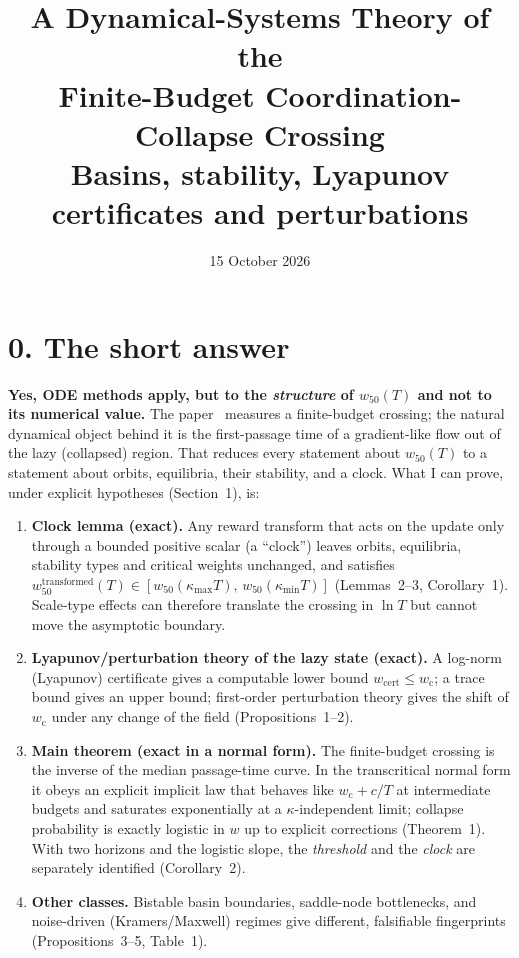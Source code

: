 \documentclass[11pt]{article}
\title{A Dynamical-Systems Theory of the\\ Finite-Budget Coordination-Collapse Crossing\\[4pt]
\large Basins, stability, Lyapunov certificates and perturbations}
\author{}
\date{15 October 2026}
\theoremstyle{definition}
\theoremstyle{remark}
\newcommand{\wcrit}{w_{\mathrm c}}
\newcommand{\wfifty}{w_{50}}
\begin{document}
\maketitle

\section*{0. The short answer}

\textbf{Yes, ODE methods apply, but to the \emph{structure} of $\wfifty(T)$ and not to its numerical value.}
The paper~\cite{P} measures a finite-budget crossing; the natural dynamical object behind it is the first-passage time of a gradient-like flow out of the lazy (collapsed) region. That reduces every statement about $\wfifty(T)$ to a statement about orbits, equilibria, their stability, and a clock. What I can prove, under explicit hypotheses (Section~1), is:

\begin{enumerate}
\item \textbf{Clock lemma (exact).} Any reward transform that acts on the update only through a bounded positive scalar (a ``clock'') leaves orbits, equilibria, stability types and critical weights unchanged, and satisfies $\wfifty^{\text{transformed}}(T)\in[\wfifty(\kappa_{\max}T),\,\wfifty(\kappa_{\min}T)]$ (Lemmas~2--3, Corollary~1). Scale-type effects can therefore translate the crossing in $\ln T$ but cannot move the asymptotic boundary.
\item \textbf{Lyapunov/perturbation theory of the lazy state (exact).} A log-norm (Lyapunov) certificate gives a computable lower bound $w_{\mathrm{cert}}\le \wcrit$; a trace bound gives an upper bound; first-order perturbation theory gives the shift of $\wcrit$ under any change of the field (Propositions~1--2).
\item \textbf{Main theorem (exact in a normal form).} The finite-budget crossing is the inverse of the median passage-time curve. In the transcritical normal form it obeys an explicit implicit law that behaves like $\wcrit+c/T$ at intermediate budgets and saturates exponentially at a $\kappa$-independent limit; collapse probability is exactly logistic in $w$ up to explicit corrections (Theorem~1). With two horizons and the logistic slope, the \emph{threshold} and the \emph{clock} are separately identified (Corollary~2).
\item \textbf{Other classes.} Bistable basin boundaries, saddle-node bottlenecks, and noise-driven (Kramers/Maxwell) regimes give different, falsifiable fingerprints (Propositions~3--5, Table~1).
\end{enumerate}
\end{document}
